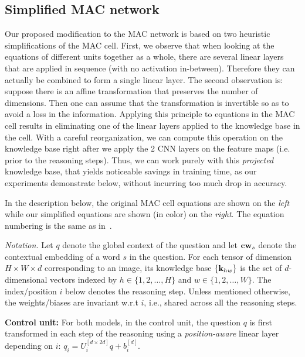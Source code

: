 \subsection{Simplified MAC network}
Our proposed modification to the MAC network is based on two heuristic
simplifications of the MAC cell. 
First, we observe that when looking at the equations of different units
together as a whole, there are several linear layers
that are applied in sequence (with no activation in-between).
Therefore they can actually be combined to form a single linear layer.
The second observation is:
suppose there is an affine transformation that preserves the number
of dimensions. Then one can assume that the transformation is invertible
so as to avoid a loss in the information. Applying this principle to 
equations in the MAC cell results in eliminating one of the linear layers applied to
the knowledge base in the cell. With a careful reorganization, we
can compute this operation on the knowledge base right after we apply the 2 
 CNN layers on the feature maps (i.e. prior to the reasoning steps). Thus, we can work purely
with this \emph{projected} knowledge base, that yields
noticeable savings in training time, as our experiments demonstrate
below, without incurring too much drop in accuracy.

In the description below, the original MAC cell equations are shown on the \emph{left}
while our simplified equations are shown (in color) on the {\color{Plum} \emph{right}}.
The equation numbering is the same as in~\cite{hudson2018compositional}.

\noindent\textit{Notation.}
Let $q$ denote the global context of the question
and let $\mathbf{cw}_s$ denote the contextual embedding of a word $s$ in the question.
For each tensor of dimension $H \times W \times d$ corresponding to an image,
its knowledge base $\{ \mathbf{k}_{hw}\}$ is the set of $d$-dimensional vectors indexed by 
$h \in \{1,2,\dots,H\}$ and $w \in \{1,2,\dots, W\}$.
The index/position $i$ below denotes the reasoning step. 
Unless mentioned otherwise, the weights/biases are invariant w.r.t $i$, 
i.e., shared across all the reasoning steps. 

\noindent\textbf{Control unit:} 
For both models, in the control unit, the question $q$ is first transformed in each step of 
the reasoning using a \emph{position-aware}
linear layer depending on $i$: $q_i = U_i^{[d \times 2d]} q + b_i^{[d]}$.

